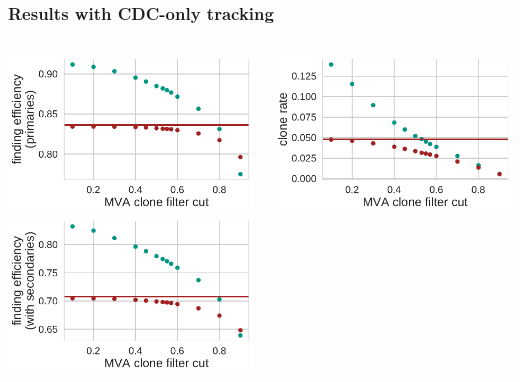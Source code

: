 \documentclass[18pt, aspectratio=169]{beamer}
\begin{document}
\begin{frame}
  \frametitle{Results with CDC-only tracking}
  \begin{columns}
    \begin{column}{0.3\textwidth}
      \centering
      \includegraphics[width=1.0\textwidth]{figures/ca_is_matched_primaries.pdf}\\
      \includegraphics[width=1.0\textwidth]{figures/ca_is_matched_with_secondaries.pdf}
    \end{column}
    \begin{column}{0.3\textwidth}
      \centering
      \includegraphics[width=1.0\textwidth]{figures/ca_clone_rate.pdf}\\

\end{column}
\end{columns}
\end{frame}
\end{document}
